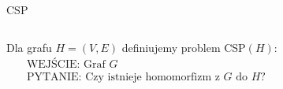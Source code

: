 \begin{frame}{CSP}

\begin{columns}

    Dla grafu \(H=(V,E)\) definiujemy problem CSP\((H)\):
    \begin{align*}
        & \text{WEJŚCIE: Graf } G \\
        & \text{PYTANIE: Czy istnieje homomorfizm z } G \text{ do } H?
    \end{align*}

    \begin{figure}
        \centering
        
    \end{figure}
\end{columns}
\vspace{3em}

\end{frame}
